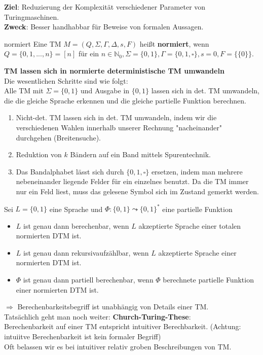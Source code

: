 \textbf{Ziel}: Reduzierung der Komplexität verschiedener Parameter von Turingmaschinen. \\
\textbf{Zweck}: Besser handhabbar für Beweise von formalen Aussagen. \\

\begin{defn}{normiert}
    Eine TM $M = (Q, \Sigma, \Gamma, \Delta, s, F)$ heißt \textbf{normiert}, wenn $Q = \{0,1,...,n\} = [n]$ für ein
    $n \in \mathbb{N}_0, \Sigma = \{0,1\}, \Gamma = \{0,1,\square\}, s=0, F = \{\{0\}\}$.
\end{defn}

\textbf{TM lassen sich in normierte deterministische TM umwandeln} \\

Die wesentlichen Schritte sind wie folgt: \\
Alle TM mit $\Sigma=\{0,1\}$ und Ausgabe in $\{0,1\}$ lassen sich in det. TM umwandeln,
die die gleiche Sprache erkennen und die gleiche partielle Funktion berechnen. \\

\begin{enumerate}
    \item Nicht-det. TM  lassen sich in det. TM umwandeln, indem wir die verschiedenen Wahlen innerhalb 
          unserer Rechnung "nacheinander" durchgehen (Breitensuche).
    \item Reduktion von $k$ Bändern auf ein Band mittels Spurentechnik.
    \item Das Bandalphabet lässt sich durch $\{0,1,\square\}$ ersetzen, indem man mehrere nebeneinander
          liegende Felder für ein einzelnes benutzt. Da die TM immer nur ein Feld liest, muss das 
          gelesene Symbol sich im Zustand gemerkt werden.
\end{enumerate}

\begin{bem}
    Sei $L = \{0,1\}$ eine Sprache und $\Phi : \{0,1\} \leadsto \{0,1\}^*$ eine partielle Funktion
    \begin{itemize}
        \item $L$ ist genau dann berechenbar, wenn $L$ akzeptierte Sprache einer totalen normierten DTM ist.
        \item $L$ ist genau dann rekursivaufzählbar, wenn $L$ akzeptierte Sprache einer normierten DTM ist.
        \item $\Phi$ ist genau dann partiell berechenbar, wenn $\Phi$ berechnete partielle Funktion einer normierten DTM ist.
    \end{itemize}
    $\Rightarrow$ Berechenbarkeitsbegriff ist unabhängig von Details einer TM. \\
    
    Tatsächlich geht man noch weiter: \textbf{Church-Turing-These}: \\
    Berechenbarkeit auf einer TM entspricht intuitiver Berechbarkeit. (Achtung: intuiitve Berechenbarkeit ist kein formaler Begriff) \\
    
    Oft belassen wir es bei intuitiver relativ groben Beschreibungen von TM.
\end{bem}

